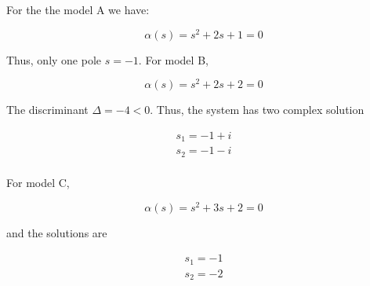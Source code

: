 For the the model A we have:

\begin{equation}
\alpha(s) = s^2 + 2s +1 =0  \nonumber
\end{equation}

Thus, only one pole $s=-1$. For model B,

\begin{equation}
\alpha(s) = s^2 + 2s +2 =0  \nonumber
\end{equation}

The discriminant $\Delta = -4 <0$.  Thus, the system has two complex solution

\begin{eqnarray}
s_1 = -1 +i  \nonumber \\
s_2 = -1 -i  \nonumber \\
\end{eqnarray}

For model C, 

\begin{equation}
\alpha(s) = s^2 + 3s +2 =0  \nonumber
\end{equation}

and the solutions are

\begin{eqnarray}
s_1 = -1   \nonumber \\
s_2 = -2  \nonumber \\
\end{eqnarray}








